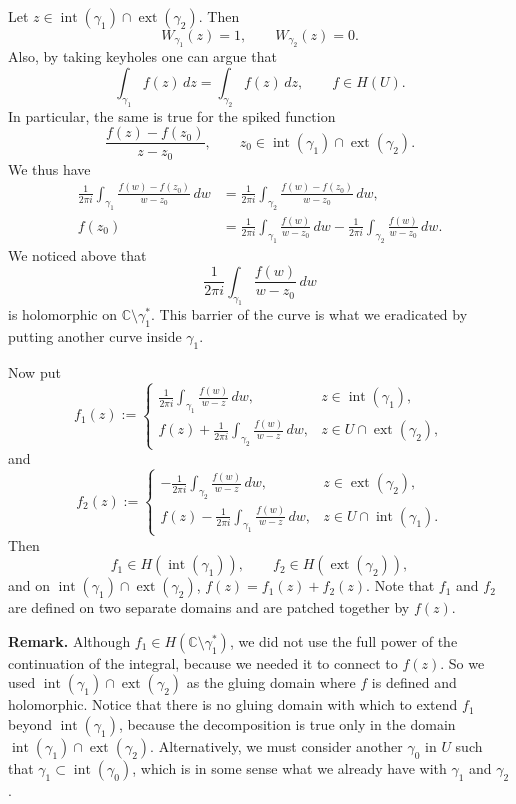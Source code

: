 \documentclass[11pt,a4paper]{article}
\begin{document}
Let $z\in\operatorname{int}(\gamma_1)\cap\operatorname{ext}(\gamma_2)$. Then
\[
  W_{\gamma_1}(z)=1,
  \qquad
  W_{\gamma_2}(z)=0.
\]
Also, by taking keyholes one can argue that
\[
  \int_{\gamma_1}f(z)\,dz=\int_{\gamma_2}f(z)\,dz,
  \qquad f\in H(U).
\]
In particular, the same is true for the spiked function
\[
  \frac{f(z)-f(z_0)}{z-z_0},
  \qquad z_0\in\operatorname{int}(\gamma_1)\cap\operatorname{ext}(\gamma_2).
\]
We thus have
\begin{align*}
  \frac{1}{2\pi i}\int_{\gamma_1}\frac{f(w)-f(z_0)}{w-z_0}\,dw
  &=\frac{1}{2\pi i}\int_{\gamma_2}\frac{f(w)-f(z_0)}{w-z_0}\,dw,\\
  f(z_0)
  &=\frac{1}{2\pi i}\int_{\gamma_1}\frac{f(w)}{w-z_0}\,dw
    -\frac{1}{2\pi i}\int_{\gamma_2}\frac{f(w)}{w-z_0}\,dw.
\end{align*}
We noticed above that
\[
  \frac{1}{2\pi i}\int_{\gamma_1}\frac{f(w)}{w-z_0}\,dw
\]
is holomorphic on $\mathbb C\setminus\gamma_1^*$. This barrier of the curve is what we eradicated by putting another curve inside $\gamma_1$.

Now put
\[
f_1(z):=
\begin{cases}
\displaystyle \frac{1}{2\pi i}\int_{\gamma_1}\frac{f(w)}{w-z}\,dw,
  &z\in\operatorname{int}(\gamma_1),\\[1.2ex]
\displaystyle f(z)+\frac{1}{2\pi i}\int_{\gamma_2}\frac{f(w)}{w-z}\,dw,
  &z\in U\cap\operatorname{ext}(\gamma_2),
\end{cases}
\]
and
\[
f_2(z):=
\begin{cases}
\displaystyle -\frac{1}{2\pi i}\int_{\gamma_2}\frac{f(w)}{w-z}\,dw,
  &z\in\operatorname{ext}(\gamma_2),\\[1.2ex]
\displaystyle f(z)-\frac{1}{2\pi i}\int_{\gamma_1}\frac{f(w)}{w-z}\,dw,
  &z\in U\cap\operatorname{int}(\gamma_1).
\end{cases}
\]
Then
\[
  f_1\in H(\operatorname{int}(\gamma_1)),
  \qquad
  f_2\in H(\operatorname{ext}(\gamma_2)),
\]
and on $\operatorname{int}(\gamma_1)\cap\operatorname{ext}(\gamma_2)$, \(f(z)=f_1(z)+f_2(z).\)
Note that $f_1$ and $f_2$ are defined on two separate domains and are patched together by $f(z)$.


\textbf{Remark.} Although $f_1\in H(\mathbb C\setminus\gamma_1^*)$, we did not use the full power of the continuation of the integral, because we needed it to connect to $f(z)$. So we used $\operatorname{int}(\gamma_1)\cap\operatorname{ext}(\gamma_2)$ as the gluing domain where $f$ is defined and holomorphic. Notice that there is no gluing domain with which to extend $f_1$ beyond $\operatorname{int}(\gamma_1)$, because the decomposition is true only in the domain $\operatorname{int}(\gamma_1)\cap\operatorname{ext}(\gamma_2)$. Alternatively, we must consider another $\gamma_0$ in $U$ such that $\gamma_1\subset\operatorname{int}(\gamma_0)$, which is in some sense what we already have with $\gamma_1$ and $\gamma_2$.
\end{document}

